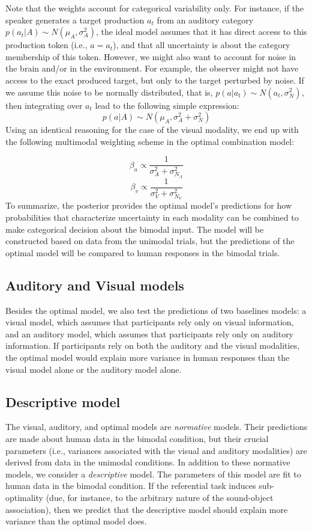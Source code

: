 \documentclass[english,man]{apa6}
\theoremstyle{definition}
\theoremstyle{definition}
\theoremstyle{definition}
\theoremstyle{remark}
\begin{document}
Note that the weights account for categorical variability only. For
instance, if the speaker generates a target production \(a_t\) from an
auditory category \(p(a_t | A) \sim N(\mu_{A}, \sigma^2_{A})\), the
ideal model assumes that it has direct access to this production token
(i.e., \(a=a_t\)), and that all uncertainty is about the category
membership of this token. However, we might also want to account for
noise in the brain and/or in the environment. For example, the observer
might not have access to the exact produced target, but only to the
target perturbed by noise. If we assume this noise to be normally
distributed, that is, \(p(a | a_t) \sim N(a_t, \sigma^2_{N})\), then
integrating over \(a_t\) lead to the following simple expression:
\[ p(a | A) \sim N(\mu_{A}, \sigma^2_{A}+\sigma^2_{N})\] Using an
identical reasoning for the case of the visual modality, we end up with
the following multimodal weighting scheme in the optimal combination
model:

\[\beta_a \propto \frac{1}{\sigma^2_{A}+\sigma^2_{N_A}}\]
\[\beta_v \propto \frac{1}{\sigma^2_{V} +\sigma^2_{N_V}}\] To summarize,
the posterior provides the optimal model's predictions for how
probabilities that characterize uncertainty in each modality can be
combined to make categorical decision about the bimodal input. The model
will be constructed based on data from the unimodal trials, but the
predictions of the optimal model will be compared to human responses in
the bimodal trials.

\subsection{Auditory and Visual
models}\label{auditory-and-visual-models}

Besides the optimal model, we also test the predictions of two baselines
models: a visual model, which assumes that participants rely only on
visual information, and an auditory model, which assumes that
participants rely only on auditory information. If participants rely on
both the auditory and the visual modalities, the optimal model would
explain more variance in human responses than the visual model alone or
the auditory model alone.

\subsection{Descriptive model}\label{descriptive-model}

The visual, auditory, and optimal models are \emph{normative} models.
Their predictions are made about human data in the bimodal condition,
but their crucial parameters (i.e., variances associated with the visual
and auditory modalities) are derived from data in the unimodal
conditions. In addition to these normative models, we consider a
\emph{descriptive} model. The parameters of this model are fit to human
data in the bimodal condition. If the referential task induces
sub-optimality (due, for instance, to the arbitrary nature of the
sound-object association), then we predict that the descriptive model
should explain more variance than the optimal model does.
\end{document}
